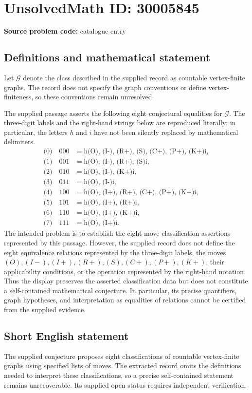 \documentclass[11pt]{article}
\begin{document}
\section*{UnsolvedMath ID: 30005845}
\textbf{Source problem code:} catalogue entry
\subsection{Definitions and mathematical statement}
Let \(\mathcal G\) denote the class described in the supplied record as countable vertex-finite graphs. The record does not specify the graph conventions or define vertex-finiteness, so these conventions remain unresolved.

The supplied passage asserts the following eight conjectural equalities for \(\mathcal G\). The three-digit labels and the right-hand strings below are reproduced literally; in particular, the letters \(h\) and \(i\) have not been silently replaced by mathematical delimiters.
\[
\begin{aligned}
\text{(0)}\quad \text{000} &= \text{h(O), (I-), (R+), (S), (C+), (P+), (K+)i},\\
\text{(1)}\quad \text{001} &= \text{h(O), (I-), (R+), (S)i},\\
\text{(2)}\quad \text{010} &= \text{h(O), (I-), (K+)i},\\
\text{(3)}\quad \text{011} &= \text{h(O), (I-)i},\\
\text{(4)}\quad \text{100} &= \text{h(O), (I+), (R+), (C+), (P+), (K+)i},\\
\text{(5)}\quad \text{101} &= \text{h(O), (I+), (R+)i},\\
\text{(6)}\quad \text{110} &= \text{h(O), (I+), (K+)i},\\
\text{(7)}\quad \text{111} &= \text{h(O), (I+)i}.
\end{aligned}
\]
The intended problem is to establish the eight move-classification assertions represented by this passage. However, the supplied record does not define the eight equivalence relations represented by the three-digit labels, the moves \((O),(I-),(I+),(R+),(S),(C+),(P+),(K+)\), their applicability conditions, or the operation represented by the right-hand notation. Thus the display preserves the asserted classification data but does not constitute a self-contained mathematical conjecture. In particular, its precise quantifiers, graph hypotheses, and interpretation as equalities of relations cannot be certified from the supplied evidence.
\subsection{Short English statement}
The supplied conjecture proposes eight classifications of countable vertex-finite graphs using specified lists of moves. The extracted record omits the definitions needed to interpret these classifications, so a precise self-contained statement remains unrecoverable. Its supplied open status requires independent verification.
\end{document}
